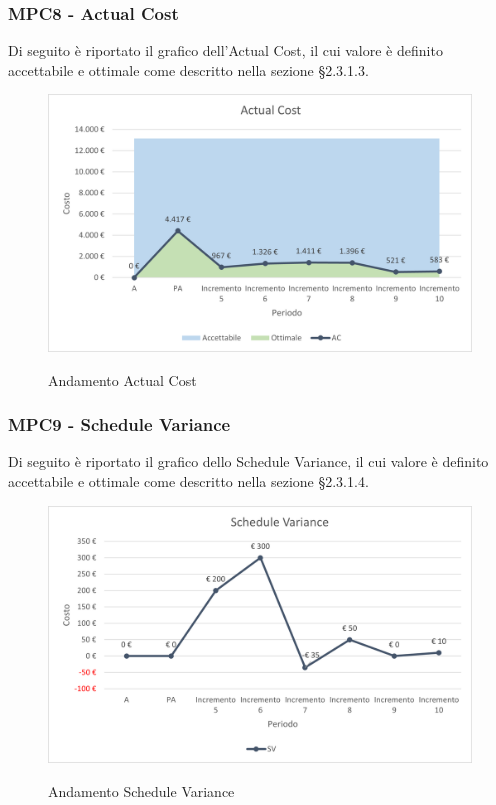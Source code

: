 \subsubsection{MPC8 - Actual Cost}
Di seguito è riportato il grafico dell'Actual Cost, il cui valore è definito accettabile e ottimale come descritto nella sezione §2.3.1.3.\\

\begin{figure}[H]
\centering
\includegraphics[scale=0.78]{res/ResocontoAttivitaDiVerifica/res/metriche/grafici/img/actualCost.png}\\
\caption{Andamento Actual Cost}
\end{figure}

\subsubsection{MPC9 - Schedule Variance}
Di seguito è riportato il grafico dello Schedule Variance, il cui valore è definito accettabile e ottimale come descritto nella sezione §2.3.1.4.\\

\begin{figure}[H]
\centering
\includegraphics[scale=0.78]{res/ResocontoAttivitaDiVerifica/res/metriche/grafici/img/scheduleVariance.png}\\
\caption{Andamento Schedule Variance}
\end{figure}

